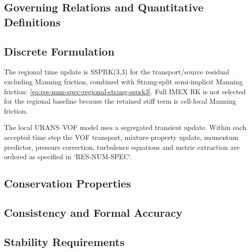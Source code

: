 \subsection{Governing Relations and Quantitative Definitions}
\label{sec:res-num-tim-governing-relations}

%

\subsection{Discrete Formulation}
\label{sec:res-num-tim-discrete-formulation}

The regional time update is SSPRK(3,3) for the transport/source
residual excluding Manning friction, combined with Strang-split
semi-implicit Manning friction:
\cref{eq:res-num-spec-regional-strang-ssprk3}. Full IMEX RK is not
selected for the regional baseline because the retained stiff term is
cell-local Manning friction.

The local URANS--VOF model uses a segregated transient update. Within
each accepted time step the VOF transport, mixture-property update,
momentum predictor, pressure correction, turbulence equations and
metric extraction are ordered as specified in `RES-NUM-SPEC`.

\subsection{Conservation Properties}
\label{sec:res-num-tim-conservation-properties}


\subsection{Consistency and Formal Accuracy}
\label{sec:res-num-tim-consistency-formal-accuracy}


\subsection{Stability Requirements}
\label{sec:res-num-tim-stability-requirements}

